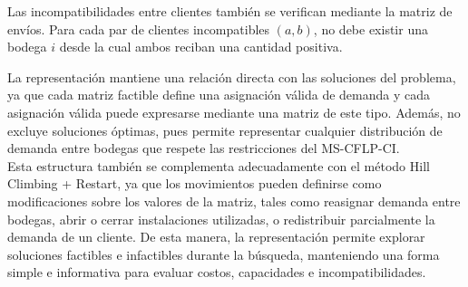 \noindent Las incompatibilidades entre clientes también se verifican mediante la matriz de envíos. Para cada par de clientes incompatibles \((a,b)\), no debe existir una bodega \(i\) desde la cual ambos reciban una cantidad positiva. 

\noindent La representación mantiene una relación directa con las soluciones del problema, ya que cada matriz factible define una asignación válida de demanda y cada asignación válida puede expresarse mediante una matriz de este tipo. Además, no excluye soluciones óptimas, pues permite representar cualquier distribución de demanda entre bodegas que respete las restricciones del MS-CFLP-CI.\\

\noindent Esta estructura también se complementa adecuadamente con el método Hill Climbing + Restart, ya que los movimientos pueden definirse como modificaciones sobre los valores de la matriz, tales como reasignar demanda entre bodegas, abrir o cerrar instalaciones utilizadas, o redistribuir parcialmente la demanda de un cliente. De esta manera, la representación permite explorar soluciones factibles e infactibles durante la búsqueda, manteniendo una forma simple e informativa para evaluar costos, capacidades e incompatibilidades.
